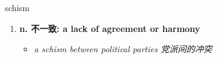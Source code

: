 
\begin{frame}
{\huge schism}
\begin{center}
\begin{enumerate}\Large
  \item \textbf{n. 不一致: a lack of agreement or harmony}
  \begin{itemize}
    \item \em{\Large{a schism between political parties 党派间的冲突}}
  \end{itemize}
\end{enumerate}
\end{center}
\end{frame}
